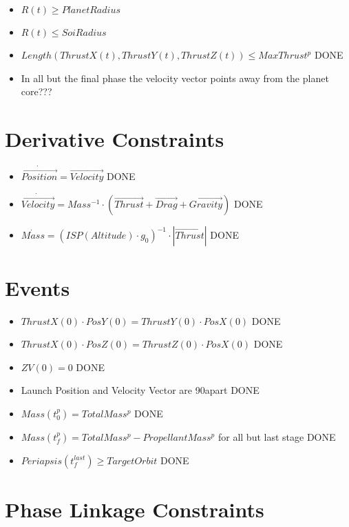 \documentclass[11pt]{report}
\newcommand{\DONE}{{DONE}}
\begin{document}
\begin{itemize}
\item $R(t) \geq PlanetRadius$
\item $R(t) \leq SoiRadius$
\item $Length(ThrustX(t), ThrustY(t), ThrustZ(t)) \leq MaxThrust^p$ \DONE
\item In all but the final phase the velocity vector points away from the planet core???
\end{itemize}

\section{Derivative Constraints}

\begin{itemize}
\item $\dot{\overrightarrow{Position}} = \overrightarrow{Velocity}$ \DONE
\item $\dot{\overrightarrow{Velocity}} = Mass^{-1}\cdot\left(\overrightarrow{Thrust} + \overrightarrow{Drag} + \overrightarrow{Gravity}\right)$ \DONE
\item $\dot{Mass} = (ISP(Altitude) \cdot g_0)^{-1}\cdot\left|\overrightarrow{Thrust}\right|$ \DONE
\end{itemize}
\section{Events}

\begin{itemize}
\item $ThrustX(0) \cdot PosY(0) = ThrustY(0) \cdot PosX(0)$ \DONE
\item $ThrustX(0) \cdot PosZ(0) = ThrustZ(0) \cdot PosX(0)$ \DONE
\item $ZV(0) = 0$ \DONE
\item Launch Position and Velocity Vector are 90\textdegree apart \DONE
\item $Mass(t_0^p) = TotalMass^p$ \DONE
\item $Mass(t_f^p) = TotalMass^p - PropellantMass^p$ for all but last stage \DONE
\item $Periapsis(t_f^{last}) \geq TargetOrbit$ \DONE
\end{itemize}

\section{Phase Linkage Constraints}
\end{document}
